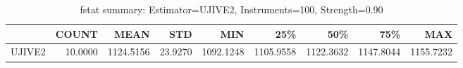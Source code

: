 \begin{table}[ht]
\centering
\caption{fstat summary: Estimator=UJIVE2, Instruments=100, Strength=0.90}
\begin{tabular}{lrrrrrrrr}
\toprule
 & COUNT & MEAN & STD & MIN & 25\% & 50\% & 75\% & MAX \\
\midrule
UJIVE2 & 10.0000 & 1124.5156 & 23.9270 & 1092.1248 & 1105.9558 & 1122.3632 & 1147.8044 & 1155.7232 \\
\bottomrule
\end{tabular}
\end{table}
